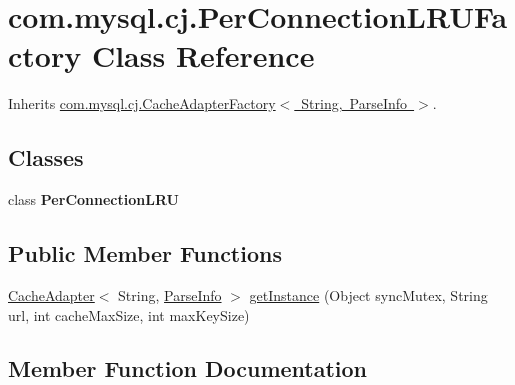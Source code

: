 \hypertarget{classcom_1_1mysql_1_1cj_1_1_per_connection_l_r_u_factory}{}\section{com.\+mysql.\+cj.\+Per\+Connection\+L\+R\+U\+Factory Class Reference}
\label{classcom_1_1mysql_1_1cj_1_1_per_connection_l_r_u_factory}


Inherits \mbox{\hyperlink{interfacecom_1_1mysql_1_1cj_1_1_cache_adapter_factory}{com.\+mysql.\+cj.\+Cache\+Adapter\+Factory$<$ String, Parse\+Info $>$}}.

\subsection*{Classes}
\begin{DoxyCompactItemize}
\item 
class {\bfseries Per\+Connection\+L\+RU}
\end{DoxyCompactItemize}
\subsection*{Public Member Functions}
\begin{DoxyCompactItemize}
\item 
\mbox{\hyperlink{interfacecom_1_1mysql_1_1cj_1_1_cache_adapter}{Cache\+Adapter}}$<$ String, \mbox{\hyperlink{classcom_1_1mysql_1_1cj_1_1_parse_info}{Parse\+Info}} $>$ \mbox{\hyperlink{classcom_1_1mysql_1_1cj_1_1_per_connection_l_r_u_factory_a772e4adb2503e41a7d469b4a0ac37981}{get\+Instance}} (Object sync\+Mutex, String url, int cache\+Max\+Size, int max\+Key\+Size)
\end{DoxyCompactItemize}


\subsection{Member Function Documentation}
\mbox{\label{classcom_1_1mysql_1_1cj_1_1_per_connection_l_r_u_factory_a772e4adb2503e41a7d469b4a0ac37981}} 
